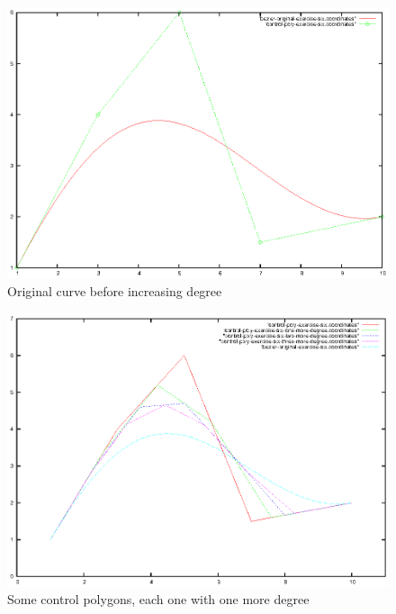 \documentclass{article}
\begin{document}
\begin{figure}[h!]
  \centering
  \includegraphics{bezier-deCasteljau-curves/exercise-six-original}
  \caption{Original curve before increasing degree}
  \label{fig:increasing-degree-original-curve}
\end{figure}

\begin{figure}[h!]
  \centering
  \includegraphics{bezier-deCasteljau-curves/exercise-six-higher-degree-control-poly}
  \caption{Some control polygons, each one with one more degree}
  \label{fig:some-increased-degrees}
\end{figure}
\end{document}
